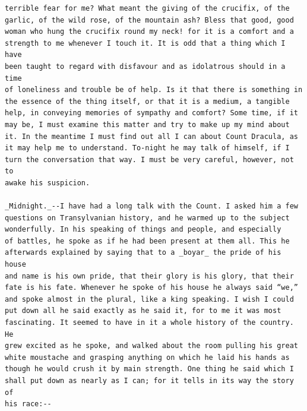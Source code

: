 \documentclass{article}
\begin{document}
\begin{verbatim}
terrible fear for me? What meant the giving of the crucifix, of the
garlic, of the wild rose, of the mountain ash? Bless that good, good
woman who hung the crucifix round my neck! for it is a comfort and a
strength to me whenever I touch it. It is odd that a thing which I have
been taught to regard with disfavour and as idolatrous should in a time
of loneliness and trouble be of help. Is it that there is something in
the essence of the thing itself, or that it is a medium, a tangible
help, in conveying memories of sympathy and comfort? Some time, if it
may be, I must examine this matter and try to make up my mind about
it. In the meantime I must find out all I can about Count Dracula, as
it may help me to understand. To-night he may talk of himself, if I
turn the conversation that way. I must be very careful, however, not to
awake his suspicion.

_Midnight._--I have had a long talk with the Count. I asked him a few
questions on Transylvanian history, and he warmed up to the subject
wonderfully. In his speaking of things and people, and especially
of battles, he spoke as if he had been present at them all. This he
afterwards explained by saying that to a _boyar_ the pride of his house
and name is his own pride, that their glory is his glory, that their
fate is his fate. Whenever he spoke of his house he always said “we,”
and spoke almost in the plural, like a king speaking. I wish I could
put down all he said exactly as he said it, for to me it was most
fascinating. It seemed to have in it a whole history of the country. He
grew excited as he spoke, and walked about the room pulling his great
white moustache and grasping anything on which he laid his hands as
though he would crush it by main strength. One thing he said which I
shall put down as nearly as I can; for it tells in its way the story of
his race:--


\end{verbatim}
\end{document}
